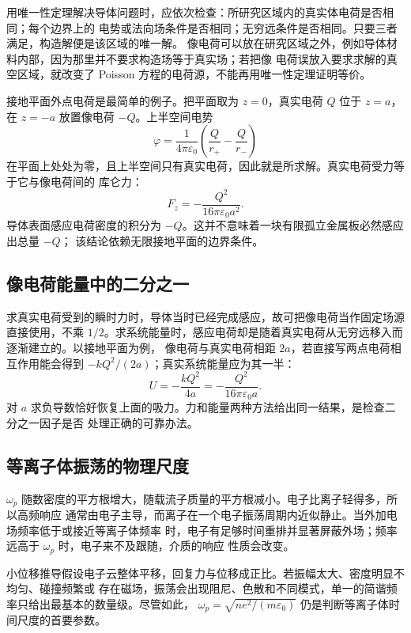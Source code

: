 用唯一性定理解决导体问题时，应依次检查：所研究区域内的真实体电荷是否相同；每个边界上的
电势或法向场条件是否相同；无穷远条件是否相同。只要三者满足，构造解便是该区域的唯一解。
像电荷可以放在研究区域之外，例如导体材料内部，因为那里并不要求构造场等于真实场；若把像
电荷误放入要求求解的真空区域，就改变了 Poisson 方程的电荷源，不能再用唯一性定理证明等价。

接地平面外点电荷是最简单的例子。把平面取为 $z=0$，真实电荷 $Q$ 位于 $z=a$，在 $z=-a$
放置像电荷 $-Q$。上半空间电势
\begin{equation}
 \varphi=\frac1{4\pi\varepsilon_0}
 \left(\frac Q{r_+}-\frac Q{r_-}\right)
\end{equation}
在平面上处处为零，且上半空间只有真实电荷，因此就是所求解。真实电荷受力等于它与像电荷间的
库仑力：
\begin{equation}
 \boxed{F_z=-\frac{Q^2}{16\pi\varepsilon_0a^2}}.
\end{equation}
导体表面感应电荷密度的积分为 $-Q$。这并不意味着一块有限孤立金属板必然感应出总量 $-Q$；
该结论依赖无限接地平面的边界条件。

\subsection*{像电荷能量中的二分之一}

求真实电荷受到的瞬时力时，导体当时已经完成感应，故可把像电荷当作固定场源直接使用，不乘
$1/2$。求系统能量时，感应电荷却是随着真实电荷从无穷远移入而逐渐建立的。以接地平面为例，
像电荷与真实电荷相距 $2a$，若直接写两点电荷相互作用能会得到
$-kQ^2/(2a)$；真实系统能量应为其一半：
\begin{equation}
 U=-\frac{kQ^2}{4a}=-\frac{Q^2}{16\pi\varepsilon_0a}.
\end{equation}
对 $a$ 求负导数恰好恢复上面的吸力。力和能量两种方法给出同一结果，是检查二分之一因子是否
处理正确的可靠办法。

\subsection*{等离子体振荡的物理尺度}

$\omega_p$ 随数密度的平方根增大，随载流子质量的平方根减小。电子比离子轻得多，所以高频响应
通常由电子主导，而离子在一个电子振荡周期内近似静止。当外加电场频率低于或接近等离子体频率
时，电子有足够时间重排并显著屏蔽外场；频率远高于 $\omega_p$ 时，电子来不及跟随，介质的响应
性质会改变。

小位移推导假设电子云整体平移，回复力与位移成正比。若振幅太大、密度明显不均匀、碰撞频繁或
存在磁场，振荡会出现阻尼、色散和不同模式，单一的简谐频率只给出最基本的数量级。尽管如此，
$\omega_p=\sqrt{ne^2/(m\varepsilon_0)}$ 仍是判断等离子体时间尺度的首要参数。
